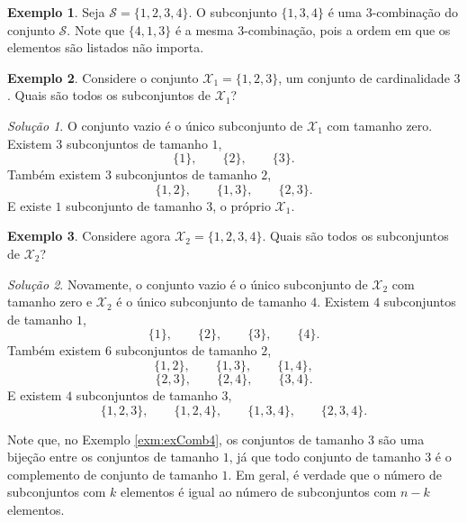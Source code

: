 \documentclass[]{book}
\theoremstyle{definition}
\theoremstyle{definition}
\newtheorem{example}{Exemplo}[chapter]
\theoremstyle{definition}
\theoremstyle{remark}
\newtheorem*{solution}{Solução}
\begin{document}
\begin{example}
\protect\hypertarget{exm:unnamed-chunk-40}{}{\label{exm:unnamed-chunk-40} }Seja \(\mathcal{S} = \{1,2,3,4\}\).
O subconjunto \(\{1,3,4\}\) é uma \(3\)-combinação do conjunto \(\mathcal{S}\).
Note que \(\{4,1,3\}\) é a mesma \(3\)-combinação, pois a ordem em que os elementos são listados não importa.
\end{example}

\begin{example}
\protect\hypertarget{exm:unnamed-chunk-41}{}{\label{exm:unnamed-chunk-41} }Considere o conjunto \(\mathcal{X}_1 = \{1,2,3\}\), um conjunto de cardinalidade \(3\).
Quais são todos os subconjuntos de \(\mathcal{X}_1\)?
\end{example}
\begin{solution}
\iffalse{} {Solução. } \fi{}O conjunto vazio é o único subconjunto de \(\mathcal{X_1}\) com tamanho zero.
Existem \(3\) subconjuntos de tamanho \(1\),
\[ \{1\}, \qquad \{2\}, \qquad \{3\}. \]
Também existem \(3\) subconjuntos de tamanho \(2\),
\[ \{1,2\}, \qquad \{1,3\}, \qquad \{2,3\}. \]
E existe \(1\) subconjunto de tamanho 3, o próprio \(\mathcal{X}_1\).
\end{solution}

\begin{example}
\protect\hypertarget{exm:exComb4}{}{\label{exm:exComb4} }Considere agora \(\mathcal{X}_2 = \{1,2,3,4\}\).
Quais são todos os subconjuntos de \(\mathcal{X}_2\)?
\end{example}

\begin{solution}
\iffalse{} {Solução. } \fi{}Novamente, o conjunto vazio é o único subconjunto de \(\mathcal{X}_2\) com tamanho zero e \(\mathcal{X}_2\) é o único subconjunto de tamanho \(4\).
Existem \(4\) subconjuntos de tamanho \(1\),
\[ \{1\}, \qquad \{2\}, \qquad \{3\}, \qquad \{4\}. \]
Também existem \(6\) subconjuntos de tamanho \(2\),
\[ \{1,2\}, \qquad \{1,3\}, \qquad \{1,4\}, \]
\[ \{2,3\}, \qquad \{2,4\}, \qquad \{3,4\}. \]
E existem \(4\) subconjuntos de tamanho 3,
\[ \{1,2,3\}, \qquad \{1,2,4\}, \qquad \{1,3,4\}, \qquad \{2,3,4\}.\]
\end{solution}

Note que, no Exemplo \ref{exm:exComb4}, os conjuntos de tamanho \(3\) são uma bijeção entre os conjuntos de tamanho \(1\), já que todo conjunto de tamanho \(3\) é o complemento de conjunto de tamanho \(1\).
Em geral, é verdade que o número de subconjuntos com \(k\) elementos é igual ao número de subconjuntos com \(n-k\) elementos.
\end{document}
